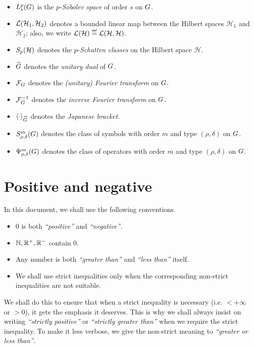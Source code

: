 \begin{itemize}
    \item $L^{p}_{s}(G)$ is the $p$-\emph{Sobolev space} of order $s$ on $G$.
    \item ${\mathcal{L} (\mathcal H_1, \mathcal H_2)}$ denotes a bounded linear map between the Hilbert spaces $\mathcal H_1$ and $\mathcal H_2$; also, we write $\Lin {\mathcal H} \defeq \Lin {\mathcal H, \mathcal H}$.
    \item $S_{p}(\mathcal H)$ denotes the $p$-\emph{Schatten classes} on the Hilbert space $\mathcal H$.
    \item ${\widehat{G}}$ denotes the \emph{unitary dual} of $G$.
    \item $\mathcal{F}_{G}$ denotes the \emph{(unitary) Fourier transform} on $G$.
    \item $\mathcal{F}^{-1}_{G}$ denotes the \emph{inverse Fourier transform} on $G$.
    \item ${\langle \cdot \rangle}_{{\widehat{G}}}$ denotes the \emph{Japanese bracket}.
    \item $S^{m}_{\rho, \delta}(G)$ denotes the class of symbols with order $m$ and type $(\rho, \delta)$ on $G$.
    \item $\Psi^{m}_{\rho, \delta}(G)$ denotes the class of operators with order $m$ and type $(\rho, \delta)$ on $G$.
\end{itemize}

\section*{Positive and negative}

In this document, we shall use the following conventions.

\begin{itemize}
    \item $0$ is both \emph{``positive''} and \emph{``negative''}.
    \item $\mathbb{N}, \mathbb{R}^+, \mathbb{R}^-$ contain $0$.
    \item Any number is both \emph{``greater than''} and \emph{``less than''} itself.
    \item We shall use strict inequalities only
        when the corresponding non-strict inequalities are not suitable.
\end{itemize}

We shall do this to ensure that
when a strict inequality is necessary (i.e. $< +\infty$ or $> 0$),
it gets the emphasis it deserves.
This is why we shall always insist on writing \emph{``strictly positive''} or \emph{``strictly greater than''} when we require the strict inequality.
To make it less verbose,
we give the non-strict meaning to \emph{``greater or less than''}.

